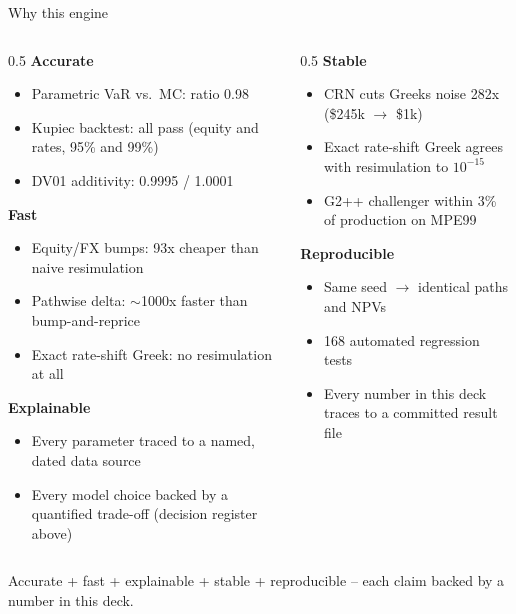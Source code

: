 \documentclass[8pt,aspectratio=169]{beamer}
\begin{document}
\begin{frame}{Why this engine}
  \small
  \begin{columns}[T]
    \begin{column}{0.5\textwidth}
      \textbf{Accurate}
      \begin{itemize}
        \item Parametric VaR vs.\ MC: ratio 0.98
        \item Kupiec backtest: all pass (equity and rates, 95\% and 99\%)
        \item DV01 additivity: 0.9995 / 1.0001
      \end{itemize}
      \textbf{Fast}
      \begin{itemize}
        \item Equity/FX bumps: 93x cheaper than naive resimulation
        \item Pathwise delta: $\sim$1000x faster than bump-and-reprice
        \item Exact rate-shift Greek: no resimulation at all
      \end{itemize}
      \textbf{Explainable}
      \begin{itemize}
        \item Every parameter traced to a named, dated data source
        \item Every model choice backed by a quantified trade-off (decision register above)
      \end{itemize}
    \end{column}
    \begin{column}{0.5\textwidth}
      \textbf{Stable}
      \begin{itemize}
        \item CRN cuts Greeks noise 282x (\$245k $\to$ \$1k)
        \item Exact rate-shift Greek agrees with resimulation to $10^{-15}$
        \item G2++ challenger within 3\% of production on MPE99
      \end{itemize}
      \textbf{Reproducible}
      \begin{itemize}
        \item Same seed $\to$ identical paths and NPVs
        \item 168 automated regression tests
        \item Every number in this deck traces to a committed result file
      \end{itemize}
    \end{column}
  \end{columns}
  \vspace{6pt}
  \centering\small Accurate + fast + explainable + stable + reproducible -- each claim backed by a number in this deck.
\end{frame}
\end{document}
